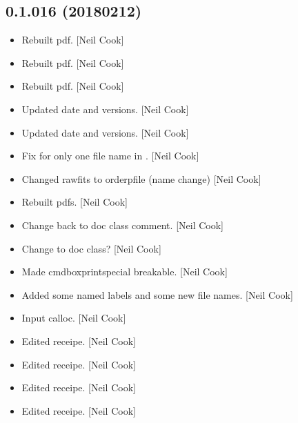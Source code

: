 \documentclass[a4paper,10pt,english]{report}
\begin{document}
\subsection{0.1.016 (2018\sphinxhyphen{}02\sphinxhyphen{}12)}
\label{\detokenize{misc/changelog:id506}}\begin{itemize}
\item {} 
Rebuilt pdf. {[}Neil Cook{]}

\item {} 
Rebuilt pdf. {[}Neil Cook{]}

\item {} 
Rebuilt pdf. {[}Neil Cook{]}

\item {} 
Updated date and versions. {[}Neil Cook{]}

\item {} 
Updated date and versions. {[}Neil Cook{]}

\item {} 
Fix for only one file name in . {[}Neil Cook{]}

\item {} 
Changed rawfits to orderpfile (name change) {[}Neil Cook{]}

\item {} 
Rebuilt pdfs. {[}Neil Cook{]}

\item {} 
Change back to doc class comment. {[}Neil Cook{]}

\item {} 
Change to doc class? {[}Neil Cook{]}

\item {} 
Made cmdboxprintspecial breakable. {[}Neil Cook{]}

\item {} 
Added some named labels and some new file names. {[}Neil Cook{]}

\item {} 
Input calloc. {[}Neil Cook{]}

\item {} 
Edited receipe. {[}Neil Cook{]}

\item {} 
Edited receipe. {[}Neil Cook{]}

\item {} 
Edited receipe. {[}Neil Cook{]}

\item {} 
Edited receipe. {[}Neil Cook{]}

\end{itemize}
\end{document}
